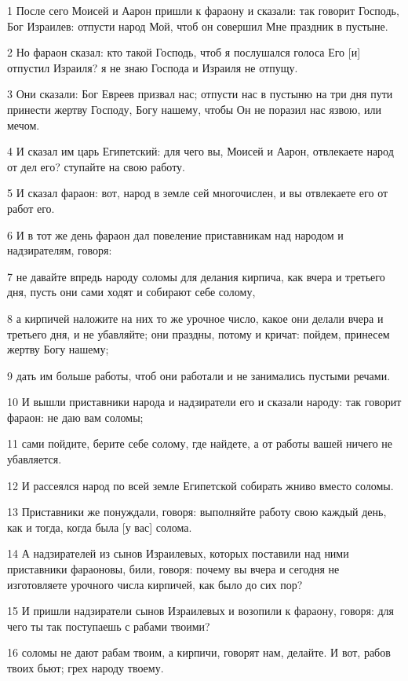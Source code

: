 \par 1 После сего Моисей и Аарон пришли к фараону и сказали: так говорит Господь, Бог Израилев: отпусти народ Мой, чтоб он совершил Мне праздник в пустыне.
\par 2 Но фараон сказал: кто такой Господь, чтоб я послушался голоса Его [и] отпустил Израиля? я не знаю Господа и Израиля не отпущу.
\par 3 Они сказали: Бог Евреев призвал нас; отпусти нас в пустыню на три дня пути принести жертву Господу, Богу нашему, чтобы Он не поразил нас язвою, или мечом.
\par 4 И сказал им царь Египетский: для чего вы, Моисей и Аарон, отвлекаете народ от дел его? ступайте на свою работу.
\par 5 И сказал фараон: вот, народ в земле сей многочислен, и вы отвлекаете его от работ его.
\par 6 И в тот же день фараон дал повеление приставникам над народом и надзирателям, говоря:
\par 7 не давайте впредь народу соломы для делания кирпича, как вчера и третьего дня, пусть они сами ходят и собирают себе солому,
\par 8 а кирпичей наложите на них то же урочное число, какое они делали вчера и третьего дня, и не убавляйте; они праздны, потому и кричат: пойдем, принесем жертву Богу нашему;
\par 9 дать им больше работы, чтоб они работали и не занимались пустыми речами.
\par 10 И вышли приставники народа и надзиратели его и сказали народу: так говорит фараон: не даю вам соломы;
\par 11 сами пойдите, берите себе солому, где найдете, а от работы вашей ничего не убавляется.
\par 12 И рассеялся народ по всей земле Египетской собирать жниво вместо соломы.
\par 13 Приставники же понуждали, говоря: выполняйте работу свою каждый день, как и тогда, когда была [у вас] солома.
\par 14 А надзирателей из сынов Израилевых, которых поставили над ними приставники фараоновы, били, говоря: почему вы вчера и сегодня не изготовляете урочного числа кирпичей, как было до сих пор?
\par 15 И пришли надзиратели сынов Израилевых и возопили к фараону, говоря: для чего ты так поступаешь с рабами твоими?
\par 16 соломы не дают рабам твоим, а кирпичи, говорят нам, делайте. И вот, рабов твоих бьют; грех народу твоему.
